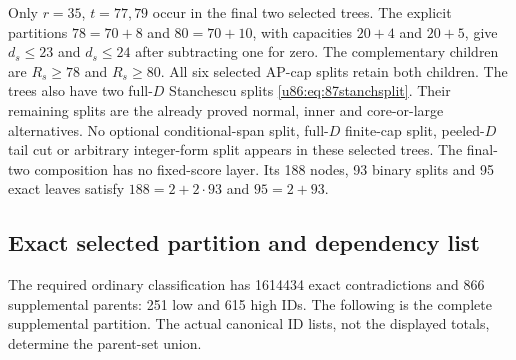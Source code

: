 \documentclass[11pt,a4paper]{article}
\theoremstyle{remark}
\begin{document}
Only $r=35$, $t=77,79$ occur in the final two selected trees.
The explicit partitions $78=70+8$ and $80=70+10$, with capacities
$20+4$ and $20+5$, give $d_s\le23$ and $d_s\le24$ after subtracting
one for zero. The complementary children are $R_s\ge78$ and
$R_s\ge80$. All six selected AP-cap splits retain both children.
The trees also have two full-$D$ Stanchescu splits
\eqref{u86:eq:87stanchsplit}. Their remaining splits are the already
proved normal, inner and core-or-large alternatives.
No optional conditional-span split, full-$D$ finite-cap split,
peeled-$D$ tail cut or arbitrary integer-form split appears in these
selected trees. The final-two composition has no fixed-score layer.
Its 188 nodes, 93 binary splits and 95 exact leaves satisfy
$188=2+2\cdot93$ and $95=2+93$.

\subsection{Exact selected partition and dependency list}

The required ordinary classification has 1614434 exact contradictions
and 866 supplemental parents: 251 low and 615 high IDs. The following
is the complete supplemental partition. The actual canonical ID lists,
not the displayed totals, determine the parent-set union.
\end{document}
